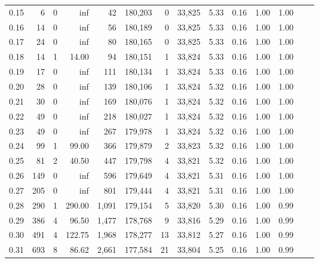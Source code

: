 \begin{tabular}{rrrrrrrrrrrrrr}
0.15 &       6 &      0 &     inf &       42 &  180,203 &       0 &  33,825 &  5.33 &  0.16 &  1.00 &      1.00 \\
0.16 &      14 &      0 &     inf &       56 &  180,189 &       0 &  33,825 &  5.33 &  0.16 &  1.00 &      1.00 \\
0.17 &      24 &      0 &     inf &       80 &  180,165 &       0 &  33,825 &  5.33 &  0.16 &  1.00 &      1.00 \\
0.18 &      14 &      1 &   14.00 &       94 &  180,151 &       1 &  33,824 &  5.33 &  0.16 &  1.00 &      1.00 \\
0.19 &      17 &      0 &     inf &      111 &  180,134 &       1 &  33,824 &  5.33 &  0.16 &  1.00 &      1.00 \\
0.20 &      28 &      0 &     inf &      139 &  180,106 &       1 &  33,824 &  5.32 &  0.16 &  1.00 &      1.00 \\
0.21 &      30 &      0 &     inf &      169 &  180,076 &       1 &  33,824 &  5.32 &  0.16 &  1.00 &      1.00 \\
0.22 &      49 &      0 &     inf &      218 &  180,027 &       1 &  33,824 &  5.32 &  0.16 &  1.00 &      1.00 \\
0.23 &      49 &      0 &     inf &      267 &  179,978 &       1 &  33,824 &  5.32 &  0.16 &  1.00 &      1.00 \\
0.24 &      99 &      1 &   99.00 &      366 &  179,879 &       2 &  33,823 &  5.32 &  0.16 &  1.00 &      1.00 \\
0.25 &      81 &      2 &   40.50 &      447 &  179,798 &       4 &  33,821 &  5.32 &  0.16 &  1.00 &      1.00 \\
0.26 &     149 &      0 &     inf &      596 &  179,649 &       4 &  33,821 &  5.31 &  0.16 &  1.00 &      1.00 \\
0.27 &     205 &      0 &     inf &      801 &  179,444 &       4 &  33,821 &  5.31 &  0.16 &  1.00 &      1.00 \\
0.28 &     290 &      1 &  290.00 &    1,091 &  179,154 &       5 &  33,820 &  5.30 &  0.16 &  1.00 &      0.99 \\
0.29 &     386 &      4 &   96.50 &    1,477 &  178,768 &       9 &  33,816 &  5.29 &  0.16 &  1.00 &      0.99 \\
0.30 &     491 &      4 &  122.75 &    1,968 &  178,277 &      13 &  33,812 &  5.27 &  0.16 &  1.00 &      0.99 \\
0.31 &     693 &      8 &   86.62 &    2,661 &  177,584 &      21 &  33,804 &  5.25 &  0.16 &  1.00 &      0.99 \\

\end{tabular}
